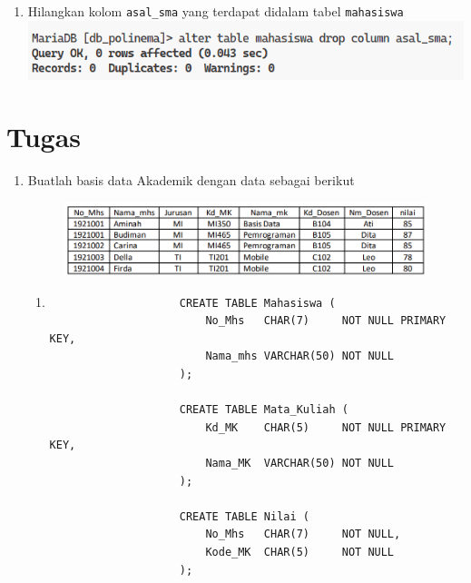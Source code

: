 \documentclass[12pt,titlepage]{article}
\begin{document}
\begin{enumerate}
{    }
    \item {
        Hilangkan kolom \texttt{asal\_sma} yang terdapat didalam tabel \texttt{mahasiswa}\\
        \includegraphics[width=.8\textwidth]{./images/practicum-14.png}
    }
\end{enumerate}
\pagebreak

\section{Tugas}
\begin{enumerate}
    \item {
        Buatlah basis data Akademik dengan data sebagai berikut

        \begin{figure}[h]
            \centering
            \includegraphics[width=\textwidth]{./images/task-1.png}
        \end{figure}

        \begin{enumerate}[label=\alph*.]
            \item {
                \begin{verbatim}
                    CREATE TABLE Mahasiswa (
                        No_Mhs   CHAR(7)     NOT NULL PRIMARY KEY,
                        Nama_mhs VARCHAR(50) NOT NULL
                    );

                    CREATE TABLE Mata_Kuliah (
                        Kd_MK    CHAR(5)     NOT NULL PRIMARY KEY,
                        Nama_MK  VARCHAR(50) NOT NULL
                    );

                    CREATE TABLE Nilai (
                        No_Mhs   CHAR(7)     NOT NULL,
                        Kode_MK  CHAR(5)     NOT NULL
                    );


\end{verbatim}}
\end{enumerate}}
\end{enumerate}
\end{document}

